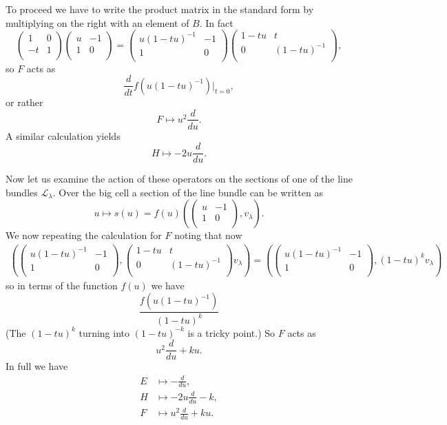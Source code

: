 \documentclass[12pt]{article}
\theoremstyle{plain}
\theoremstyle{definition}
\numberwithin{equation}{section}
\newcommand{\la}{\lambda}
\newcommand{\CL}{\mathcal{L}}
\begin{document}
To proceed we have to write the product matrix in the standard form by multiplying on the right with an element of $B$. In fact
\[
\left(
\begin{array}{cc}
1 & 0 \\
-t & 1 \\
\end{array}
\right)\left(
\begin{array}{cc}
u & -1 \\
1 & 0 \\
\end{array}
\right) = \left(
\begin{array}{cc}
u(1-tu)^{-1} & -1 \\
1 & 0 \\
\end{array}
\right)\left(
\begin{array}{cc}
1-tu & t \\
0 & (1-tu)^{-1} \\
\end{array}
\right),
\]
so $F$ acts as
\[
\frac{d}{dt} f(u(1-tu)^{-1}) |_{t=0},
\]
or rather
\[
F \mapsto u^2 \frac{d}{du}.
\]
A similar calculation yields
\[
H \mapsto -2u \frac{d}{du}.
\]

Now let us examine the action of these operators on the sections of one of the line bundles $\CL_{\la}$. Over the big cell a section of the line bundle can be written as
\[
u \mapsto s(u) =  f(u) (\left(
\begin{array}{cc}
u & -1 \\
1 & 0 \\
\end{array}
\right), v_\la).
\]
We now repeating the calculation for $F$ noting that now
\begin{align*}
( \left(
\begin{array}{cc}
u(1-tu)^{-1} & -1 \\
1 & 0 \\
\end{array}
\right), \left(
\begin{array}{cc}
1-tu & t \\
0 & (1-tu)^{-1} \\
\end{array}
\right) v_\la ) = ( \left(
\begin{array}{cc}
u(1-tu)^{-1} & -1 \\
1 & 0 \\
\end{array}
\right), (1-tu)^k v_\la )
\end{align*}
so in terms of the function $f(u)$ we have
\[
\frac{f(u(1-tu)^{-1})}{(1-tu)^k}
\]
(The $(1-tu)^k$ turning into $(1-tu)^{-k}$ is a tricky point.) So $F$ acts as
\[
u^2 \frac{d}{du} + ku.
\]
In full we have
\begin{align*}
E &\mapsto -\frac{d}{du}, \\
%
H &\mapsto -2u \frac{d}{du} - k, \\
%
F &\mapsto u^2 \frac{d}{du} + ku.
\end{align*}
\end{document}
